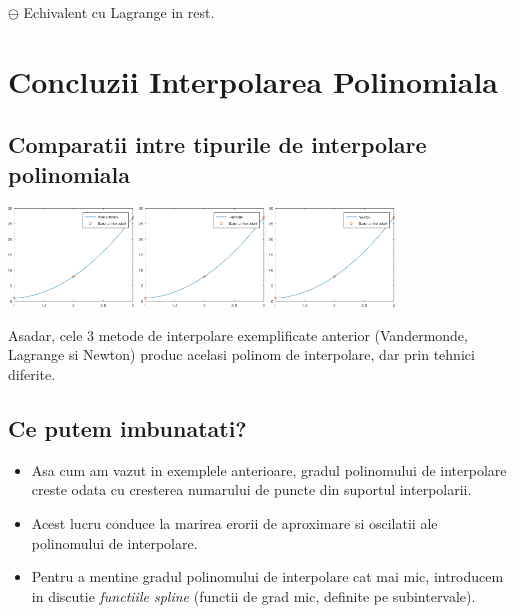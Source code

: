 \documentclass{article}
\begin{document}
$\ominus$ Echivalent cu Lagrange in rest.

\section{Concluzii Interpolarea Polinomiala}
\label{sec:concluzii_polinomiala}

\subsection{Comparatii intre tipurile de interpolare polinomiala}

\begin{center}
    \includegraphics[width=0.25\textwidth]{vandermonde_ex}
    \includegraphics[width=0.25\textwidth]{lagrange_ex}
    \includegraphics[width=0.25\textwidth]{newton_ex}
\end{center}
\tab Asadar, cele 3 metode de interpolare exemplificate anterior (Vandermonde, Lagrange si Newton) produc acelasi polinom de interpolare, dar prin tehnici diferite.


\subsection{Ce putem imbunatati?}
\begin{itemize}
    \item Asa cum am vazut in exemplele anterioare, gradul polinomului de interpolare creste odata cu cresterea numarului de puncte din suportul interpolarii.
    
    \item Acest lucru conduce la marirea erorii de aproximare si oscilatii ale polinomului de interpolare.
    
    \item Pentru a mentine gradul polinomului de interpolare cat mai mic, introducem in discutie \textit{functiile spline} (functii de grad mic, definite pe subintervale).
\end{itemize}
\end{document}

